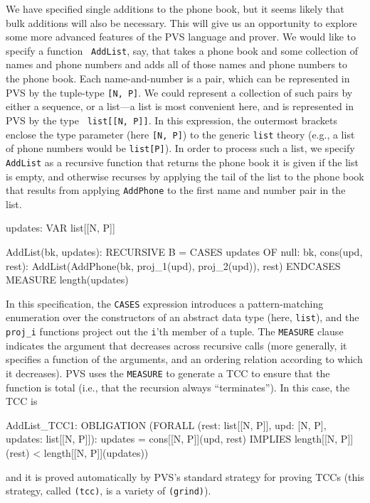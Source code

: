 We have specified single additions to the phone book, but it seems
likely that bulk additions will also be necessary.  This will give us
an opportunity to explore some more advanced features of the PVS
language and prover.  We would like to specify a function {\tt
AddList}, say, that takes a phone book and some collection of names
and phone numbers and adds all of those names and phone numbers to the
phone book.  Each name-and-number is a pair, which can be represented
in PVS by the tuple-type {\tt [N, P]}.  We could represent a
collection of such pairs by either a sequence, or a list---a list is
most convenient here, and is represented in PVS by the type {\tt
list[[N, P]]}.  In this expression, the outermost brackets enclose the
type parameter (here {\tt [N, P]}) to the generic {\tt list} theory
(e.g., a list of phone numbers would be {\tt list[P]}).  In order to
process such a list, we specify {\tt AddList} as a recursive function
that returns the phone book it is given if the list is empty, and
otherwise recurses by applying the tail of the list to the phone book
that results from applying {\tt AddPhone} to the first name and number
pair in the list.

\begin{pvsexample}
updates: VAR list[[N, P]]

AddList(bk, updates): RECURSIVE B = 
  CASES updates OF
    null: bk,
    cons(upd, rest): AddList(AddPhone(bk, proj_1(upd), proj_2(upd)), rest)
  ENDCASES
  MEASURE length(updates)
\end{pvsexample}

In this specification, the {\tt CASES} expression introduces a
pattern-matching enumeration over the constructors of an abstract data
type (here, {\tt list}), and the {\tt proj\_i} functions project out
the {\tt i}'th member of a tuple.  The {\tt MEASURE} clause indicates
the argument that decreases across recursive calls (more generally, it
specifies a function of the arguments, and an ordering relation
according to which it decreases).  PVS uses the {\tt MEASURE} to
generate a TCC to ensure that the function is total (i.e., that the
recursion always ``terminates'').  In this case, the TCC is
\begin{pvsexample}

  AddList_TCC1: OBLIGATION
      (FORALL (rest: list[[N, P]], upd: [N, P], updates: list[[N, P]]):
         updates = cons[[N, P]](upd, rest)
           IMPLIES length[[N, P]](rest) < length[[N, P]](updates))
\end{pvsexample}
and it is proved automatically by PVS's standard strategy for proving
TCCs (this strategy, called {\tt (tcc)}, is a variety of {\tt (grind)}).

